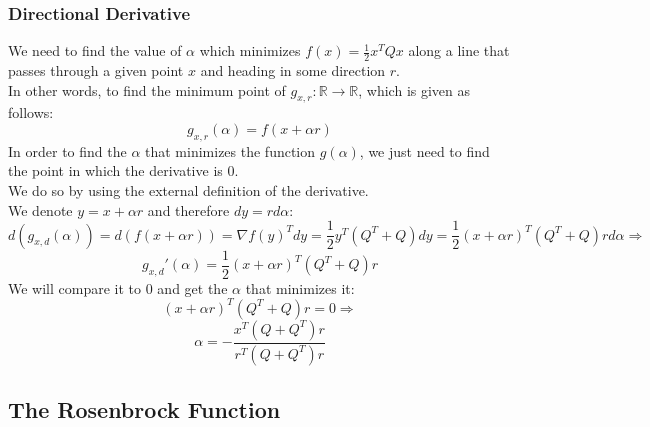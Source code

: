 \documentclass{article}
\begin{document}
\subsubsection{Directional Derivative}
We need to find the value of $\alpha$ which minimizes $f(x)=\frac{1}{2} x^T Q x$ along a line that passes through a given point $x$ and heading in some direction $r$.\\
In other words, to find the minimum point of $g_{x,r} : \mathbb{R} \rightarrow \mathbb{R}$, which is given as follows:\\
$$g_{x,r}(\alpha) = f(x + \alpha r)$$
In order to find the $\alpha$ that minimizes the function $g(\alpha)$, we just need to find the point in which the derivative is 0.\\
We do so by using the external definition of the derivative.\\
We denote $y=x + \alpha r$ and therefore $dy= r d\alpha$:\\
$$d(g_{x,d}(\alpha)) = d(f(x + \alpha r)) = \nabla f(y)^T dy = \frac{1}{2} y^T (Q^T + Q) dy = \frac{1}{2} (x + \alpha r)^T (Q^T + Q) r d\alpha \Rightarrow$$
$$g_{x,d}'(\alpha) = \frac{1}{2} (x + \alpha r)^T (Q^T + Q)r$$
We will compare it to 0 and get the $\alpha$ that minimizes it:
$$(x + \alpha r)^T (Q^T + Q)r=0 \Rightarrow$$
$$\alpha = -\frac{x^T(Q + Q^T)r}{r^T(Q + Q^T)r}$$

\subsection{The Rosenbrock Function}
\end{document}
